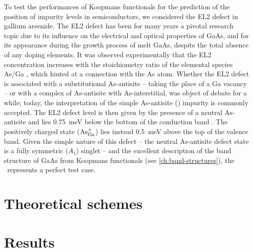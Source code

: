 To test the performances of Koopmans functionals for the prediction of the position of impurity levels in semiconductors, we considered the EL2 defect in gallium arsenide. The EL2 defect has been for many years a pivotal research topic due to its influence on the electrical and optical properties of GaAs, and for its appearance during the growth process of melt GaAs, despite the total absence of any doping elements. It was observed experimentally that the EL2 concentration increases with the stoichiometry ratio of the elemental species As/Ga \cite{kaminska_el2_1987}, which hinted at a connection with the As atom. Whether the EL2 defect is associated with a substitutional As-antisite -- taking the place of a Ga vacancy -- or with a complex of As-antisite with As-interstitial, was object of debate for a while; today, the interpretation of the simple As-antisite (\asga) impurity is commonly accepted. The EL2 defect level is then given by the presence of a neutral As-antisite and lies 0.75~\si{\milli\electronvolt} below the bottom of the conduction band \cite{kaminska_el2_1987,dabrowski_isolated_1989}. The positively charged state ($\rm As_{Ga}^+$) lies instead 0.5~\si{\milli\electronvolt} above the top of the valence band. Given the simple nature of this defect -- the neutral As-antisite defect state is a fully symmetric ($A_1$) singlet -- and the excellent description of the band structure of GaAs from Koopmans functionals (see \cref{ch:band-structures}), the \asga~represents a perfect test case.


 

\section{Theoretical schemes}

\section{Results}





